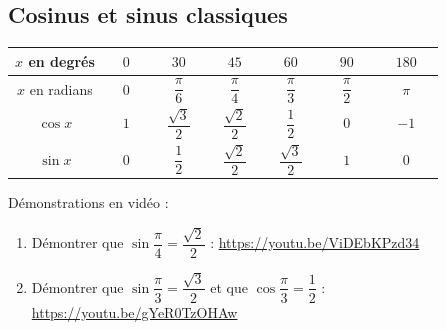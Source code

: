\documentclass[a4paper,11pt,cours]{nsi} %
\begin{document}

\subsection*{Cosinus et sinus classiques}
\begin{center}
	\renewcommand{\arraystretch}{2.2}
    \tabstyle[UGLiOrange]
	\begin{tabular}{|c|c|c|c|c|c|c|}
		\hline 
		\ccell $x$ en degrés & $\quad 0\quad $&$\quad 30\quad$ &$\quad 45\quad $&$\quad 60\quad$ &$\quad 90\quad$ &$\quad 180\quad$ \\ 
		\hline 
		\ccell $x$ en radians & $0$ & $\dfrac{\pi}{6}$ & $\dfrac{\pi}{4}$ & $\dfrac{\pi}{3}$ & $\dfrac{\pi}{2}$ & $\pi$ \\ 
		\hline 
		\ccell $\cos x$ & $1$ & $\dfrac{\sqrt{3}}{2}$ & $\dfrac{\sqrt{2}}{2}$ & $\dfrac{1}{2}$ & 0 & $-1$ \\ 
		\hline 
		\ccell $\sin x$ & 0 & $\dfrac{1}{2}$ & $\dfrac{\sqrt{2}}{2}$ & $\dfrac{\sqrt{3}}{2}$ & $1$ & $0$ \\ 
		\hline 
	\end{tabular} 
\end{center}

\begin{demonstration}
	Démonstrations en vidéo : 
	\begin{enumerate}[label=\textbullet]
		\item 	Démontrer que $\sin\dfrac{\pi}{4}=\dfrac{\sqrt{2}}{2}$ : \href{ https://youtu.be/ViDEbKPzd34}{https://youtu.be/ViDEbKPzd34}
		\item Démontrer que $\sin\dfrac{\pi}{3}=\dfrac{\sqrt{3}}{2}$ et que $\cos\dfrac{\pi}{3}=\dfrac{1}{2}$ :	\href{https://youtu.be/gYeR0TzOHAw}{https://youtu.be/gYeR0TzOHAw}	
	\end{enumerate}
\end{demonstration}
\end{document}
